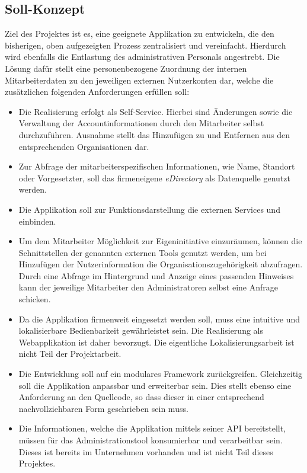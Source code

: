 \subsection{Soll-Konzept}
\label{sec:Soll-Konzept}
Ziel des Projektes ist es, eine geeignete Applikation zu entwickeln, die den bisherigen, oben
aufgezeigten Prozess zentralisiert und vereinfacht. Hierdurch wird ebenfalls die Entlastung des
administrativen Personals angestrebt. Die Lösung dafür stellt eine personenbezogene Zuordnung der
internen Mitarbeiterdaten zu den jeweiligen externen Nutzerkonten dar, welche die zusätzlichen folgenden
Anforderungen erfüllen soll:
\begin{itemize}
  \item Die Realisierung erfolgt als Self-Service. Hierbei sind Änderungen sowie die Verwaltung
  der Accountinformationen durch den Mitarbeiter selbst durchzuführen. Ausnahme stellt das Hinzufügen
  zu und Entfernen aus den entsprechenden Organisationen dar.
  \item Zur Abfrage der mitarbeiterspezifischen Informationen, wie Name, Standort oder Vorgesetzter, soll
  das firmeneigene \textit{eDirectory} als Datenquelle genutzt werden.
  \item Die Applikation soll zur Funktionsdarstellung die externen Services  und  einbinden.
  \item Um dem Mitarbeiter Möglichkeit zur Eigeninitiative einzuräumen, können die Schnittstellen der
  genannten externen Tools genutzt werden, um bei Hinzufügen der Nutzerinformation
  die Organisationszugehörigkeit abzufragen. Durch eine Abfrage im Hintergrund und Anzeige eines
  passenden Hinweises kann der jeweilige Mitarbeiter den Administratoren selbst eine Anfrage schicken.
  \item Da die Applikation firmenweit eingesetzt werden soll, muss eine intuitive und lokalisierbare
  Bedienbarkeit gewährleistet sein. Die Realisierung als Webapplikation ist daher bevorzugt.
  Die eigentliche Lokalisierungsarbeit ist nicht Teil der Projektarbeit.
  \item Die Entwicklung soll auf ein modulares Framework zurückgreifen. Gleichzeitig soll die Applikation
  anpassbar und erweiterbar sein. Dies stellt ebenso eine Anforderung an den Quellcode, so dass dieser
  in einer entsprechend nachvollziehbaren Form geschrieben sein muss.
  \item Die Informationen, welche die Applikation mittels seiner API bereitstellt, müssen für das Administrationstool
   konsumierbar und verarbeitbar sein. Dieses ist bereits im Unternehmen vorhanden und
  ist nicht Teil dieses Projektes.
\end{itemize}

